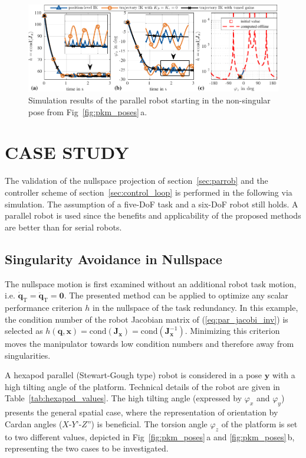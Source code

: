 \documentclass[a4paper,twoside]{article}
\begin{document}
\begin{figure}[tb] %
	\includegraphics{figures/pkm_nullspace_case1_overview.pdf}
	\caption{Simulation results of the parallel robot starting in the non-singular pose from Fig~\ref{fig:pkm_poses}\,a.}
	\label{fig:pkm_results_from_nonsingular}
\end{figure}

\section{\uppercase{Case Study}}
\label{sec:casestudy}


The validation of the nullspace projection of section~\ref{sec:parrob} and the controller scheme of section~\ref{sec:control_loop} is performed in the following via simulation.
The assumption of a five-DoF task and a six-DoF robot still holds.
A parallel robot is used since the benefits and applicability of the proposed methods are better than for serial robots.

\subsection{Singularity Avoidance in Nullspace}
\label{sec:casestudy_nullspace}

The nullspace motion is first examined without an additional robot task motion, i.e. $\dot{\bm{q}}_\mathrm{T}=\ddot{\bm{q}}_\mathrm{T}=\bm{0}$.
The presented method can be applied to optimize any scalar performance criterion $h$ in the nullspace of the task redundancy.
In this example, the condition number of the robot Jacobian matrix of (\ref{eq:par_jacobi_inv}) is selected as $h(\bm{q},\bm{x})=\mathrm{cond}(\bm{J}_{\bm{x}})=\mathrm{cond}(\bm{J}_{\bm{x}}^{-1})$.
Minimizing this criterion moves the manipulator towards low condition numbers and therefore away from singularities.

A hexapod parallel (Stewart-Gough type) robot is considered in a pose $\bm{y}$ with a high tilting angle of the platform.
Technical details of the robot are given in Table~\ref{tab:hexapod_values}.
The high tilting angle (expressed by $\varphi_x$ and $\varphi_y$) presents the general spatial case, where the representation of orientation by Cardan angles ($X$-$Y$'-$Z$'') is beneficial.
The torsion angle $\varphi_z$ of the platform is set to two different values, depicted in Fig~\ref{fig:pkm_poses}\,a and \ref{fig:pkm_poses}\,b, representing the two cases to be investigated.
\end{document}
